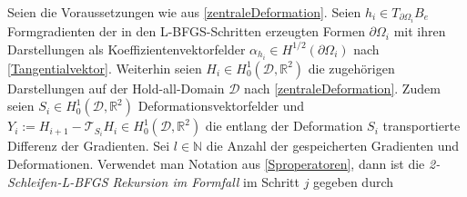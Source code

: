 \begin{defi}
	Seien die Voraussetzungen wie aus \ref{zentraleDeformation}. Seien $h_i \in T_{\partial\Omega_i}B_e$ Formgradienten der in den L-BFGS-Schritten erzeugten Formen $\partial\Omega_i$ mit ihren Darstellungen als Koeffizientenvektorfelder $\alpha_{h_i} \in H^{1/2}(\partial\Omega_i)$ nach \ref{Tangentialvektor}. Weiterhin seien $H_i \in H^1_0(\mathcal{D}, \mathbb{R}^2)$ die zugehörigen Darstellungen auf der Hold-all-Domain $\mathcal{D}$ nach \ref{zentraleDeformation}. Zudem seien $S_i \in H^1_0(\mathcal{D}, \mathbb{R}^2)$ Deformationsvektorfelder und $Y_i := H_{i+1} - \mathcal{T}_{S_i}H_i \in H^1_0(\mathcal{D}, \mathbb{R}^2)$ die entlang der Deformation $S_i$ transportierte Differenz der Gradienten. Sei $l \in \mathbb{N}$ die Anzahl der gespeicherten Gradienten und Deformationen. Verwendet man Notation aus \ref{Sproperatoren}, dann ist die \textit{2-Schleifen-L-BFGS Rekursion im Formfall} im Schritt $j$ gegeben durch 


\end{defi}
